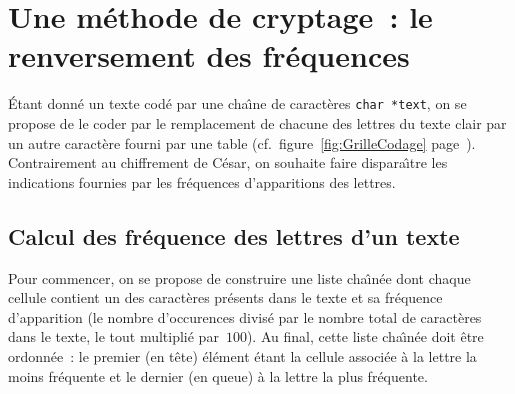 \section{Une m\'ethode de cryptage~: le renversement des fr\'equences}
\'Etant donn\'e un texte cod\'e par une cha\^\i{}ne de caract\`eres
\verb+char *text+, on se propose de le coder par le remplacement de
chacune des lettres du texte clair par un autre caract\`ere fourni par
une table (cf.\ figure~\ref{fig:GrilleCodage} page~\pageref{fig:GrilleCodage}). Contrairement au
chiffrement de C\'esar, on souhaite faire dispara\^\i{}tre les
indications fournies par les fr\'equences d'apparitions des lettres.
\subsection{Calcul des fr\'equence des lettres d'un texte}
\label{sec:frequence}
Pour commencer, on se propose de construire une liste cha\^\i{}n\'ee
dont chaque cellule contient un des caract\`eres pr\'esents dans le
texte et sa fr\'equence d'apparition (le nombre d'occurences divis\'e
par le nombre total de caract\`eres dans le texte, le tout multipli\'e
par~$100$). Au final, cette liste cha\^\i{}n\'ee doit \^etre
ordonn\'ee~: le premier (en t\^ete) \'el\'ement \'etant la cellule
associ\'ee \`a la lettre la moins fr\'equente et le dernier (en queue)
\`a la lettre la plus fr\'equente.
